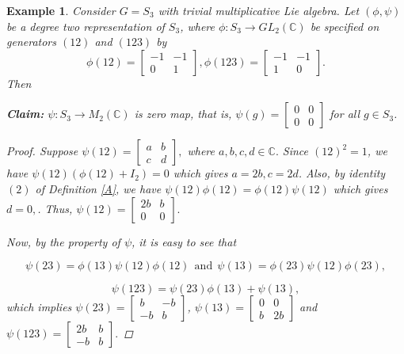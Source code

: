 \documentclass[10 pt,oneside,reqno,a4paper]{amsart}
\newtheorem{example}[theorem]{Example}
\numberwithin{equation}{section}
\newcommand{\field}[1]{\mathbb{#1}}          \newcommand{\Q}{\field{Q}}
\newcommand{\C}{\field{C}}                   \newcommand{\A}{\field{A}}
\begin{document}
\begin{example}\label{1.12}
    Consider $G=S_3$ with trivial multiplicative Lie algebra. Let $(\phi,\psi)$ be a degree two representation of $S_3$, where $\phi: S_3 \rightarrow GL_2(\C)$ be specified on generators $(12)$ and $(123)$ by \[\phi(12)=
\begin{bmatrix}
-1 & -1 \\
0 & 1
\end{bmatrix}
 , \phi(123)=
\begin{bmatrix}
-1 & -1 \\
1 & 0
\end{bmatrix}.
\] Then 

\textbf{Claim:} $\psi:S_3 \to M_2(\C)$ is zero map, that is, $\psi(g)=\begin{bmatrix}
0 & 0 \\
0 & 0
\end{bmatrix}$ for all $g\in S_3$.

\begin{proof}
Suppose $\psi(12)=\begin{bmatrix}
    a & b  \\ c & d
\end{bmatrix},$ where $a,b,c,d\in \mathbb{C}.$ Since $(12)^{2} = 1$, we have $\psi(12)(\phi(12)+ I_2)=0$ which gives $a=2b, c=2d$. Also,  by identity $(2)$ of Definition \ref{A}, we have $\psi(12)\phi(12)=\phi(12)\psi(12)$ which gives $d=0,$. Thus, $\psi(12)=\begin{bmatrix}
    2b & b \\ 0 & 0
\end{bmatrix}.$

Now, by the property of $\psi$, it is easy to see that 

$$\psi(23)= \phi(13)\psi(12)\phi(12) ~~\text{and}~~ \psi(13)= \phi(23)\psi(12)\phi(23),$$

$$\psi(123)= \psi(23) \phi(13) + \psi(13)       ,$$
which implies $\psi(23)=\begin{bmatrix}
    b & -b \\ -b & b
\end{bmatrix}$, $\psi(13)=\begin{bmatrix}
    0 & 0 \\ b & 2b
\end{bmatrix}$  and $\psi(123)=\begin{bmatrix}
    2b & b \\ -b & b
\end{bmatrix}.$






\end{proof}
\end{example}
\end{document}
